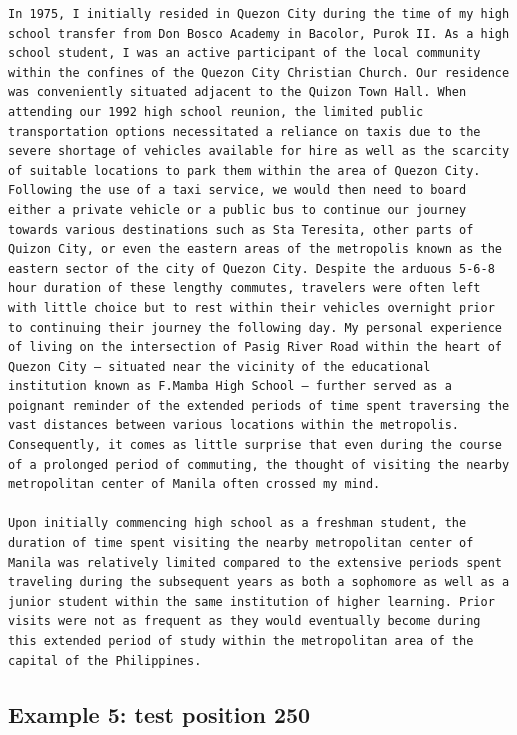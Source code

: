 \begin{Verbatim}
In 1975, I initially resided in Quezon City during the time of my high school transfer from Don Bosco Academy in Bacolor, Purok II. As a high school student, I was an active participant of the local community within the confines of the Quezon City Christian Church. Our residence was conveniently situated adjacent to the Quizon Town Hall. When attending our 1992 high school reunion, the limited public transportation options necessitated a reliance on taxis due to the severe shortage of vehicles available for hire as well as the scarcity of suitable locations to park them within the area of Quezon City. Following the use of a taxi service, we would then need to board either a private vehicle or a public bus to continue our journey towards various destinations such as Sta Teresita, other parts of Quizon City, or even the eastern areas of the metropolis known as the eastern sector of the city of Quezon City. Despite the arduous 5-6-8 hour duration of these lengthy commutes, travelers were often left with little choice but to rest within their vehicles overnight prior to continuing their journey the following day. My personal experience of living on the intersection of Pasig River Road within the heart of Quezon City – situated near the vicinity of the educational institution known as F.Mamba High School – further served as a poignant reminder of the extended periods of time spent traversing the vast distances between various locations within the metropolis. Consequently, it comes as little surprise that even during the course of a prolonged period of commuting, the thought of visiting the nearby metropolitan center of Manila often crossed my mind.

Upon initially commencing high school as a freshman student, the duration of time spent visiting the nearby metropolitan center of Manila was relatively limited compared to the extensive periods spent traveling during the subsequent years as both a sophomore as well as a junior student within the same institution of higher learning. Prior visits were not as frequent as they would eventually become during this extended period of study within the metropolitan area of the capital of the Philippines.
\end{Verbatim}

\subsection{Example 5: test position
250}\label{record-docs-watermarking-qualitative-paper-kgw-bira-md-example-5-test-position-250}

